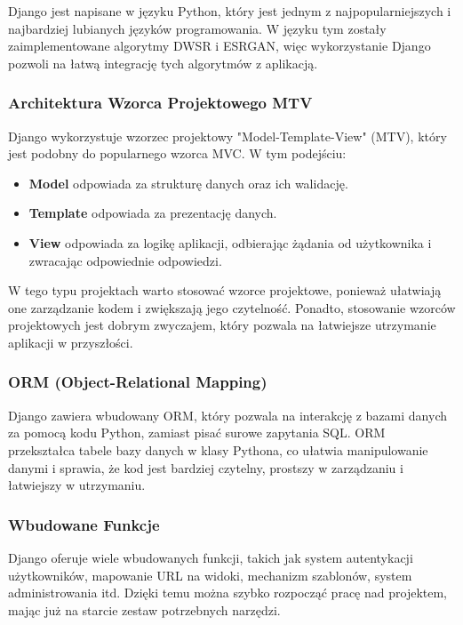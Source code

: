 Django jest napisane w języku Python, który jest jednym z najpopularniejszych i najbardziej lubianych języków programowania. W języku tym zostały zaimplementowane algorytmy DWSR i ESRGAN, więc wykorzystanie Django pozwoli na łatwą integrację tych algorytmów z aplikacją.

\subsubsection*{Architektura Wzorca Projektowego MTV}

Django wykorzystuje wzorzec projektowy "Model-Template-View" (MTV), który jest podobny do popularnego wzorca MVC. W tym podejściu:
\begin{itemize}
    \item \textbf{Model} odpowiada za strukturę danych oraz ich walidację.
    \item \textbf{Template} odpowiada za prezentację danych.
    \item \textbf{View} odpowiada za logikę aplikacji, odbierając żądania od użytkownika i zwracając odpowiednie odpowiedzi.
\end{itemize}

W tego typu projektach warto stosować wzorce projektowe, ponieważ ułatwiają one zarządzanie kodem i zwiększają jego czytelność. Ponadto, stosowanie wzorców projektowych jest dobrym zwyczajem, który pozwala na łatwiejsze utrzymanie aplikacji w przyszłości.

\subsubsection*{ORM (Object-Relational Mapping)}

Django zawiera wbudowany ORM, który pozwala na interakcję z bazami danych za pomocą kodu Python, zamiast pisać surowe zapytania SQL. ORM przekształca tabele bazy danych w klasy Pythona, co ułatwia manipulowanie danymi i sprawia, że kod jest bardziej czytelny, prostszy w zarządzaniu i łatwiejszy w utrzymaniu.

\subsubsection*{Wbudowane Funkcje}

Django oferuje wiele wbudowanych funkcji, takich jak system autentykacji użytkowników, mapowanie URL na widoki, mechanizm szablonów, system administrowania itd. Dzięki temu można szybko rozpocząć pracę nad projektem, mając już na starcie zestaw potrzebnych narzędzi.

